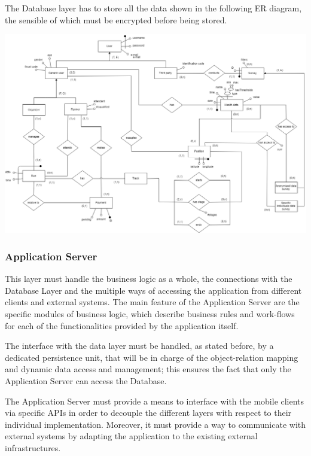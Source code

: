 The Database layer has to store all the data shown in the following ER diagram, the sensible of which must be encrypted before being stored.

\begin{center}
\includegraphics[scale=0.34]{sections/diagrams/ER.png}
\newline
{}
\end{center}

\subsubsection{Application Server}
This layer must handle the business logic as a whole, the connections with the Database Layer and the multiple ways of accessing the application from different clients and external systems. The main feature of the Application Server are the specific modules of business logic, which describe business rules and work-flows for each of the functionalities provided by the application itself. \newline

The interface with the data layer must be handled, as stated before, by a dedicated persistence unit, that will be in charge of the object-relation mapping and dynamic data access and management; this ensures the fact that only the Application Server can access the Database. \newline

The Application Server must provide a means to interface with the mobile clients via specific APIs in order to decouple the different layers with respect to their individual implementation. Moreover, it must provide a way to communicate with external systems by adapting the application to the existing external infrastructures. \newline

